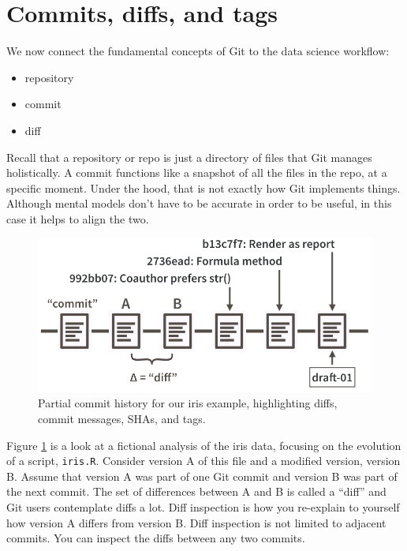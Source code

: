 \documentclass[
]{book}
\providecommand{\tightlist}{%
  \setlength{\itemsep}{0pt}\setlength{\parskip}{0pt}}
\begin{document}
\section{Commits, diffs, and tags}\label{commits-diffs-and-tags}

We now connect the fundamental concepts of Git to the data science workflow:

\begin{itemize}
\tightlist
\item
  repository
\item
  commit
\item
  diff
\end{itemize}

Recall that a repository or repo is just a directory of files that Git manages holistically. A commit functions like a snapshot of all the files in the repo, at a specific moment. Under the hood, that is not exactly how Git implements things. Although mental models don't have to be accurate in order to be useful, in this case it helps to align the two.

\begin{figure}
\includegraphics[width=1\linewidth]{img/commit-diff-sha-tag} \caption{\label{fig:commit-diff-sha-tag}Partial commit history for our iris example, highlighting diffs, commit messages, SHAs, and tags.}\label{fig:commit-diff-sha-tag}
\end{figure}

Figure \ref{fig:commit-diff-sha-tag} is a look at a fictional analysis of the iris data, focusing on the evolution of a script, \texttt{iris.R}. Consider version A of this file and a modified version, version B. Assume that version A was part of one Git commit and version B was part of the next commit. The set of differences between A and B is called a ``diff'' and Git users contemplate diffs a lot. Diff inspection is how you re-explain to yourself how version A differs from version B. Diff inspection is not limited to adjacent commits. You can inspect the diffs between any two commits.
\end{document}
